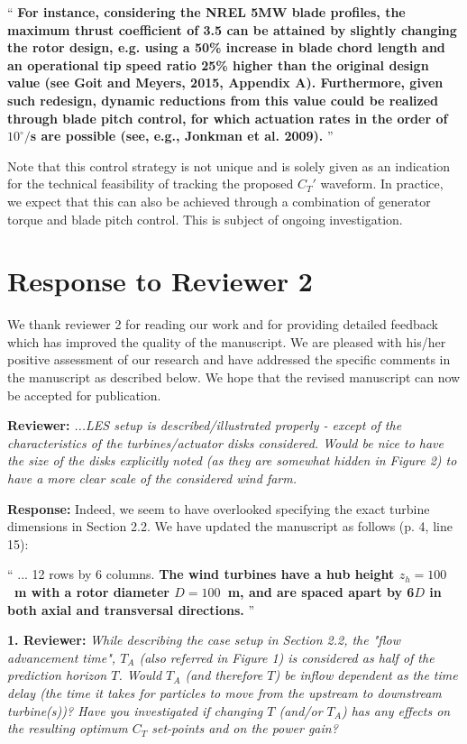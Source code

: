 \documentclass[]{article}
\begin{document}
``
\textbf{For instance, considering the NREL 5MW blade profiles, the maximum thrust coefficient of 3.5 can be attained by slightly changing the rotor design, e.g. using a 50\% increase in blade chord length and an operational tip speed ratio 25\% higher than 
the original design value (see Goit and Meyers, 2015, Appendix A). Furthermore, given such redesign, dynamic reductions from this value could be realized through blade pitch control, for which actuation rates in the order of $10^\circ/$s are possible (see, e.g., Jonkman et al. 2009).} 
''

Note that this control strategy is not unique and is solely given as an indication for the technical feasibility of tracking the proposed $C_T'$ waveform. In practice, we expect that this can also be achieved through a combination of generator torque and blade pitch control. This is subject of ongoing investigation.


\clearpage
\section*{Response to Reviewer 2}
We thank reviewer 2 for reading our work and for providing detailed feedback which has improved the quality of the manuscript. We are pleased with his/her positive assessment of our research and have addressed the specific comments in the manuscript as described below. We hope that the revised manuscript can now be accepted for publication. 

\dotfill

\textbf{Reviewer: } \textit{...LES setup is described/illustrated properly - except of the characteristics of the turbines/actuator disks considered. Would be nice to have the size of the disks explicitly noted (as they are somewhat hidden in Figure 2) to have a more clear scale of the considered wind farm.}

\textbf{Response: } Indeed, we seem to have overlooked specifying the exact turbine dimensions in Section 2.2. We have updated the manuscript as follows (p. 4, line 15): 

``
... 12 rows by 6 columns. \textbf{The wind turbines have a hub height $z_h = 100$~m with a rotor diameter $D = 100$~m, and are spaced apart by 6$D$ in both axial and transversal directions.}
''

\dotfill

\textbf{1. Reviewer: } \textit{While describing the case setup in Section 2.2, the "flow advancement time", $T_A$ (also
	referred in Figure 1) is considered as half of the prediction horizon $T$. Would $T_A$ (and
	therefore $T$) be inflow dependent as the time delay (the time it takes for particles to
	move from the upstream to downstream turbine(s))? Have you investigated if changing
	$T$ (and/or $T_A$) has any effects on the resulting optimum $C_T$ set-points and on the power
	gain?}
\end{document}

